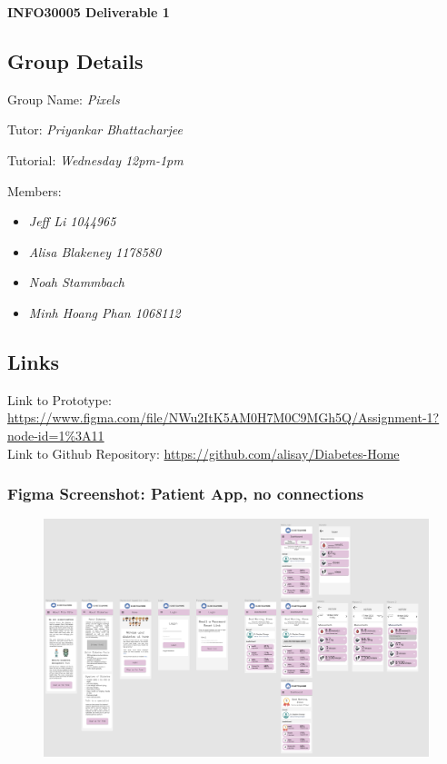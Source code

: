 \documentclass[12pt]{article}
\begin{document}
\begin{center}
\Huge\bf INFO30005 Deliverable 1
\end{center}

\subsection*{Group Details}
Group Name: \textit{Pixels}\par
Tutor: \textit{Priyankar Bhattacharjee}\par
Tutorial: \textit{Wednesday 12pm-1pm}\par
Members: \vspace{-2ex}
\begin{itemize}[noitemsep]
	\item \textit{Jeff Li 1044965}
	\item \textit{Alisa Blakeney 1178580}
	\item \textit{Noah Stammbach}
	\item \textit{Minh Hoang Phan 1068112}
\end{itemize}
\subsection*{Links}
Link to Prototype: {\small\url{https://www.figma.com/file/NWu2ItK5AM0H7M0C9MGh5Q/Assignment-1?node-id=1\%3A11}}\\
Link to Github Repository: {\small\url{https://github.com/alisay/Diabetes-Home}}
\newpage
\subsubsection*{Figma Screenshot: Patient App, no connections}
\begin{figure}[H]
	\centering
	\includegraphics[width=.8\textwidth]{patient_nolines}
\end{figure}
\end{document}
